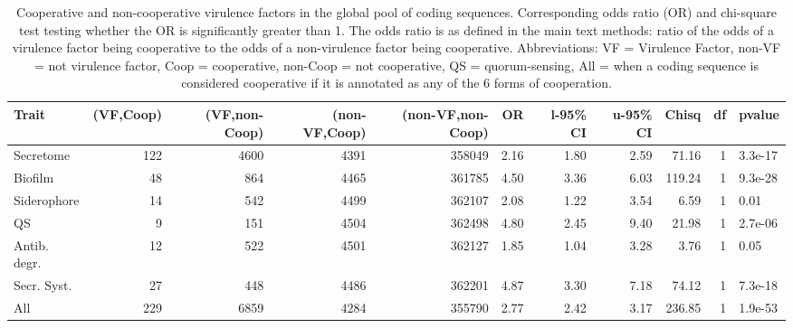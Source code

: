\begin{table}

\caption{\label{tab:}Cooperative and non-cooperative virulence factors in the global pool of coding sequences.
               Corresponding odds ratio (OR) and chi-square test testing whether the OR is significantly greater than 1.
               The odds ratio is as defined in the main text methods: ratio of the odds of a virulence factor being cooperative to the odds of a non-virulence factor being cooperative.
               Abbreviations: VF = Virulence Factor, non-VF = not virulence factor, Coop = cooperative, non-Coop = not cooperative, QS = quorum-sensing, All = when a coding sequence is considered cooperative if it is annotated as any of the 6 forms of cooperation.}
\centering
\begin{tabular}[t]{lrrrrrrrrrl}
\toprule
Trait & (VF,Coop) & (VF,non-Coop) & (non-VF,Coop) & (non-VF,non-Coop) & OR & l-95\% CI & u-95\% CI & Chisq & df & pvalue\\
\midrule
Secretome & 122 & 4600 & 4391 & 358049 & 2.16 & 1.80 & 2.59 & 71.16 & 1 & 3.3e-17\\
Biofilm & 48 & 864 & 4465 & 361785 & 4.50 & 3.36 & 6.03 & 119.24 & 1 & 9.3e-28\\
Siderophore & 14 & 542 & 4499 & 362107 & 2.08 & 1.22 & 3.54 & 6.59 & 1 & 0.01\\
QS & 9 & 151 & 4504 & 362498 & 4.80 & 2.45 & 9.40 & 21.98 & 1 & 2.7e-06\\
Antib. degr. & 12 & 522 & 4501 & 362127 & 1.85 & 1.04 & 3.28 & 3.76 & 1 & 0.05\\
\addlinespace
Secr. Syst. & 27 & 448 & 4486 & 362201 & 4.87 & 3.30 & 7.18 & 74.12 & 1 & 7.3e-18\\
All & 229 & 6859 & 4284 & 355790 & 2.77 & 2.42 & 3.17 & 236.85 & 1 & 1.9e-53\\
\bottomrule
\end{tabular}
\end{table}
